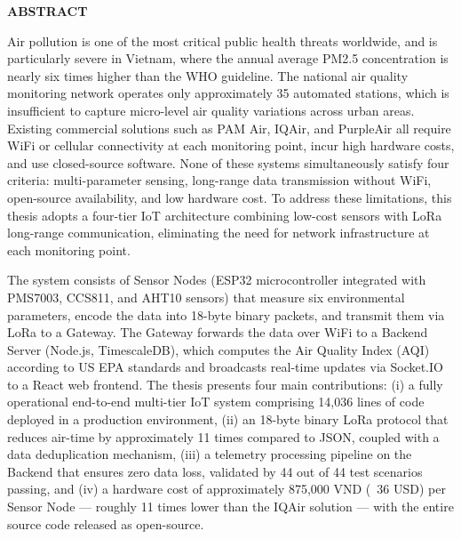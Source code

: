 \documentclass[../DoAn.tex]{subfiles}
\begin{document}
\begin{center}
    \Large{\textbf{ABSTRACT}}\\
\end{center}
\vspace{1cm}
Air pollution is one of the most critical public health threats worldwide, and is particularly severe in Vietnam, where the annual average PM2.5 concentration is nearly six times higher than the WHO guideline. The national air quality monitoring network operates only approximately 35 automated stations, which is insufficient to capture micro-level air quality variations across urban areas. Existing commercial solutions such as PAM Air, IQAir, and PurpleAir all require WiFi or cellular connectivity at each monitoring point, incur high hardware costs, and use closed-source software. None of these systems simultaneously satisfy four criteria: multi-parameter sensing, long-range data transmission without WiFi, open-source availability, and low hardware cost. To address these limitations, this thesis adopts a four-tier IoT architecture combining low-cost sensors with LoRa long-range communication, eliminating the need for network infrastructure at each monitoring point.

The system consists of Sensor Nodes (ESP32 microcontroller integrated with PMS7003, CCS811, and AHT10 sensors) that measure six environmental parameters, encode the data into 18-byte binary packets, and transmit them via LoRa to a Gateway. The Gateway forwards the data over WiFi to a Backend Server (Node.js, TimescaleDB), which computes the Air Quality Index (AQI) according to US EPA standards and broadcasts real-time updates via Socket.IO to a React web frontend. The thesis presents four main contributions: (i) a fully operational end-to-end multi-tier IoT system comprising 14,036 lines of code deployed in a production environment, (ii) an 18-byte binary LoRa protocol that reduces air-time by approximately 11 times compared to JSON, coupled with a data deduplication mechanism, (iii) a telemetry processing pipeline on the Backend that ensures zero data loss, validated by 44 out of 44 test scenarios passing, and (iv) a hardware cost of approximately 875,000 VND (~36 USD) per Sensor Node --- roughly 11 times lower than the IQAir solution --- with the entire source code released as open-source.
\end{document}
